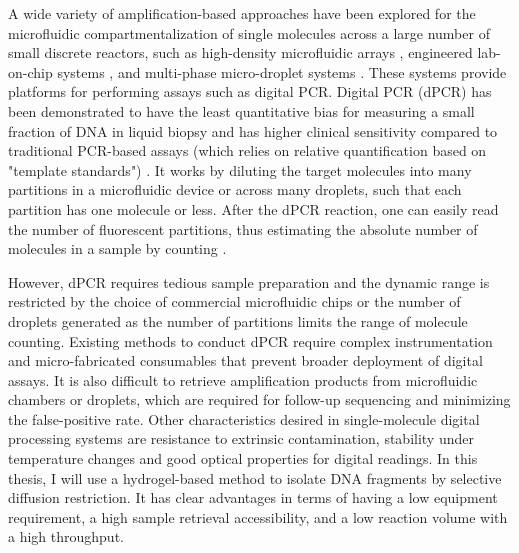 A wide variety of amplification-based approaches have been explored for the microfluidic compartmentalization of single molecules across a large number of small discrete reactors, such as high-density microfluidic arrays \cite{Love:2013hf}, engineered lab-on-chip systems \cite{Thorsen:2002dn,Landry:2013dh,deBourcy:2014ji,Marcy:2007ip}, and multi-phase micro-droplet systems \cite{Fu:2015gl,Thorsen:2001td,Hindson:2011fg,Morinishi:2015jx}. These systems provide platforms for performing assays such as digital PCR. Digital PCR (dPCR) has been demonstrated to have the least quantitative bias for measuring a small fraction of DNA in liquid biopsy and has higher clinical sensitivity compared to traditional PCR-based assays (which relies on relative quantification based on "template standards") \cite{Lun:2008cp,Bengtsson:2005ep,Wills:2013ht}. It works by diluting the target molecules into many partitions in a microfluidic device or across many droplets, such that each partition has one molecule or less. After the dPCR reaction, one can easily read the number of fluorescent partitions, thus estimating the absolute number of molecules in a sample by counting \cite{Vogelstain:1999ve}. 

However, dPCR requires tedious sample preparation and the dynamic range is restricted by the choice of commercial microfluidic chips or the number of droplets generated \cite{Hindson:2011fg} as the number of partitions limits the range of molecule counting. Existing methods to conduct dPCR require complex instrumentation and micro-fabricated consumables that prevent broader deployment of digital assays. It is also difficult to retrieve amplification products from microfluidic chambers or droplets, which are required for follow-up sequencing and minimizing the false-positive rate. Other characteristics desired in single-molecule digital processing systems are resistance to extrinsic contamination, stability under temperature changes and good optical properties for digital readings. In this thesis, I will use a hydrogel-based method to isolate DNA fragments by selective diffusion restriction. It has clear advantages in terms of having a low equipment requirement, a high sample retrieval accessibility, and a low reaction volume with a high throughput. 


